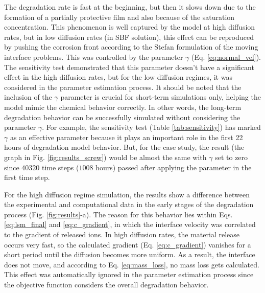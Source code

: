 The degradation rate is fast at the beginning, but then it slows down due to the formation of a partially protective film and also because of the saturation concentration. This phenomenon is well captured by the model at high diffusion rates, but in low diffusion rates (in \gls{SBF} solution), this effect can be reproduced by pushing the corrosion front according to the Stefan formulation of the moving interface problems. This was controlled by the parameter $\gamma$ (Eq. \ref{eq:normal_vel}). The sensitivity test demonstrated that this parameter doesn't have a significant effect in the high diffusion rates, but for the low diffusion regimes, it was considered in the parameter estimation process.
It should be noted that the inclusion of the $\gamma$ parameter is crucial for short-term simulations only, helping the model mimic the chemical behavior correctly.
In other words, the long-term degradation behavior can be successfully simulated without considering the parameter $\gamma$. For example, the sensitivity test (Table \ref{tab:sensitivity}) has marked $\gamma$ as an effective parameter because it plays an important role in the first 22 hours of degradation model behavior. But, for the case study, the result (the graph in Fig. \ref{fig:results_screw}) would be almost the same with $\gamma$ set to zero since $\num{40320}$ time steps ($\num{1008}$ hours) passed after applying the parameter in the first time step.

For the high diffusion regime simulation, the results show a difference between the experimental and computational data in the early stages of the degradation process (Fig. \ref{fig:results}-a). The reason for this behavior lies within Eqs. \ref{eq:lsm_final} and \ref{eq:c_gradient}, in which the interface velocity was correlated to the gradient of released ions. In high diffusion rates, the material release occurs very fast, so the calculated gradient (Eq. \ref{eq:c_gradient}) vanishes for a short period until the diffusion becomes more uniform. As a result, the interface does not move, and according to Eq. \ref{eq:mass_loss}, no mass loss gets calculated. This effect was automatically ignored in the parameter estimation process since the objective function considers the overall degradation behavior.

